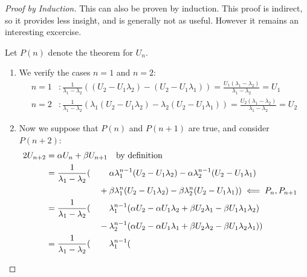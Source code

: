 \begin{proof}[Proof by Induction]
 This can also be proven by induction. This proof is indirect, so it provides
 less insight, and is generally not as useful. However it remains an
 interesting excercise.

 Let \(P(n)\) denote the theorem for \(U_n\).
 \begin{enumerate}[label=\Roman*.]
  \item \label{basec_thm_fibo} We verify the cases \(n = 1\) and \(n = 2\):
        \begin{align*}
         n = 1&\colon \frac 1{\lambda_1 - \lambda_2}
                 ((U_2 - U_1 \lambda_2) - (U_2 - U_1 \lambda_1))
                = \frac {U_1(\lambda_1 - \lambda_2)}{\lambda_1 - \lambda_2}
                = U_1 \\
         n = 2&\colon \frac 1{\lambda_1 - \lambda_2}
                 (\lambda_1(U_2 - U_1 \lambda_2)
                - \lambda_2(U_2 - U_1 \lambda_1))
                = \frac {U_2(\lambda_1 - \lambda_2)}{\lambda_1 - \lambda_2}
                = U_2
        \end{align*}
  \item \label{induct_thm_fibo} Now we suppose that \(P(n)\) and \(P(n + 1)\)
        are true, and consider \(P(n + 2)\):
        \begin{alignat*}2
         U_{n + 2} &= \mathrlap{\alpha U_n + \beta U_{n + 1}
                      \quad \text{by definition}} \\
                   &= \frac 1{\lambda_1 - \lambda_2}(
                     &&\alpha\lambda_1^{n - 1}(U_2 - U_1 \lambda_2)
                     - \alpha\lambda_2^{n - 1}(U_2 - U_1 \lambda_1) \\
              &&{}+{}& \beta\lambda_1^n(U_2 - U_1 \lambda_2)
                     - \beta\lambda_2^n(U_2 - U_1 \lambda_1))
                       \impliedby P_n, P_{n + 1} \\
                   &= \frac 1{\lambda_1 - \lambda_2}(
                     &&\lambda_1^{n - 1}(
                        \alpha U_2 - \alpha U_1 \lambda_2 +
                        \beta U_2 \lambda_1 - \beta U_1 \lambda_1 \lambda_2) \\
              &&{}-{}& \lambda_2^{n - 1}(
                        \alpha U_2 - \alpha U_1 \lambda_1 +
                        \beta U_2 \lambda_2 - \beta U_1 \lambda_2 \lambda_1)
                      ) \\
                   &= \frac 1{\lambda_1 - \lambda_2}(
                     &&\lambda_1^{n - 1}(

\end{alignat*}
\end{enumerate}
\end{proof}
